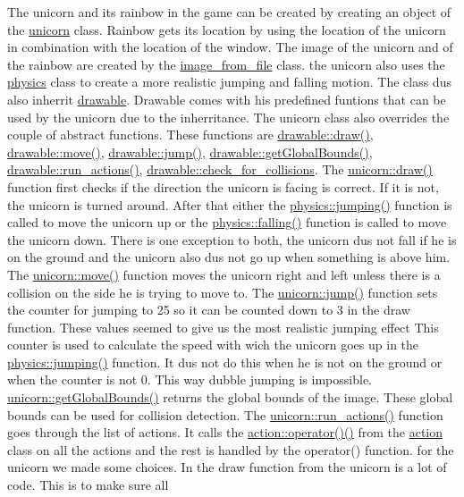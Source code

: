 The unicorn and it\textquotesingle{}s rainbow in the game can be created by creating an object of the \hyperlink{classunicorn}{unicorn} class. Rainbow get\textquotesingle{}s it\textquotesingle{}s location by using the location of the unicorn in combination with the location of the window. The image of the unicorn and of the rainbow are created by the \hyperlink{classimage__from__file}{image\+\_\+from\+\_\+file} class. the unicorn also uses the \hyperlink{classphysics}{physics} class to create a more realistic jumping and falling motion. The class dus also inherrit \hyperlink{classdrawable}{drawable}. Drawable comes with his predefined funtions that can be used by the unicorn due to the inherritance. The unicorn class also overrides the couple of abstract functions. These functions are \hyperlink{classdrawable_a4e49e2c1121704c83ce24c5f48dd910f}{drawable\+::draw()}, \hyperlink{classdrawable_ad0d3930c045cc6776aa2c3965be32491}{drawable\+::move()}, \hyperlink{classdrawable_ac39691470b7874f5dec59efe649d3981}{drawable\+::jump()}, \hyperlink{classdrawable_ae013ac0be47538be9ce885d6642daf73}{drawable\+::get\+Global\+Bounds()}, \hyperlink{classdrawable_a715df01a318331e5611a2b0ad30109ff}{drawable\+::run\+\_\+actions()}, \hyperlink{classdrawable_abbc6e0089d502ba48c3fcb9c96e3966e}{drawable\+::check\+\_\+for\+\_\+collisions}. The \hyperlink{classunicorn_a570c34d5669a8d2a61bdc1481e6f9dee}{unicorn\+::draw()} function first checks if the direction the unicorn is facing is correct. If it is not, the unicorn is turned around. After that either the \hyperlink{classphysics_aaf1c57aa6e35b9c83ccbfdfa8c18468c}{physics\+::jumping()} function is called to move the unicorn up or the \hyperlink{classphysics_acca1ee2fb8b760b6e4ee61ae7c2ee3da}{physics\+::falling()} function is called to move the unicorn down. There is one exception to both, the unicorn dus not fall if he is on the ground and the unicorn also dus not go up when something is above him. The \hyperlink{classunicorn_a162f200a68342f7bc0baaf17c8cf3f9f}{unicorn\+::move()} function moves the unicorn right and left unless there is a collision on the side he is trying to move to. The \hyperlink{classunicorn_a07d5ca4e66632c0e871221a27146805a}{unicorn\+::jump()} function sets the counter for jumping to 25 so it can be counted down to 3 in the draw function. These values seemed to give us the most realistic jumping effect This counter is used to calculate the speed with wich the unicorn goes up in the \hyperlink{classphysics_aaf1c57aa6e35b9c83ccbfdfa8c18468c}{physics\+::jumping()} function. It dus not do this when he is not on the ground or when the counter is not 0. This way dubble jumping is impossible. \hyperlink{classunicorn_a1bac09fc59b04f14f5a093bc4daa04da}{unicorn\+::get\+Global\+Bounds()} returns the global bounds of the image. These global bounds can be used for collision detection. The \hyperlink{classunicorn_aadb47a9981c46d6add8704074df117df}{unicorn\+::run\+\_\+actions()} function goes through the list of actions. It calls the \hyperlink{classaction_a92c003677656b5b3e6e58b19376e6b04}{action\+::operator()()} from the \hyperlink{classaction}{action} class on all the actions and the rest is handled by the operator() function. for the unicorn we made some choices. In the draw function from the unicorn is a lot of code. This is to make sure all 